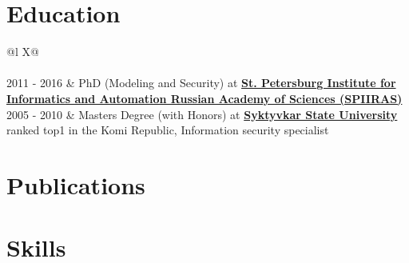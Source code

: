 \documentclass[a4paper,12pt]{article}
\begin{document}
\section{Education}
\begin{tabularx}{\linewidth}{@{}l X@{}}
 \\
 \\[4pt]

2011 - 2016 & PhD (Modeling and Security) at \textbf{\href{http://www.spiiras.nw.ru/en/}{St. Petersburg Institute for Informatics and Automation Russian Academy of Sciences (SPIIRAS)}} \\

2005 - 2010 & Masters Degree (with Honors) at \textbf{\href{https://en.syktsu.ru/}{Syktyvkar State University}} ranked top1 in the Komi Republic, Information security specialist \\[-4pt]

\end{tabularx}

\section{Publications}
{\footnotesize
\begin{refsection}
\nocite{nosal2011modeling, nosal2013justification}
\printbibliography[heading=none]
\end{refsection}
}



\section{Skills}
\end{document}
